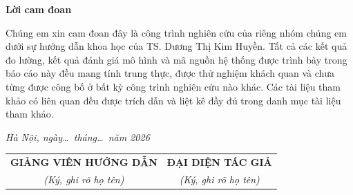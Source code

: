 
\begin{center}
    \Large{\textbf{Lời cam đoan}}
\end{center}
\vspace{1cm}

Chúng em xin cam đoan đây là công trình nghiên cứu của riêng nhóm chúng em dưới sự hướng dẫn khoa học của TS. Dương Thị Kim Huyền. Tất cả các kết quả đo lường, kết quả đánh giá mô hình và mã nguồn hệ thống được trình bày trong báo cáo này đều mang tính trung thực, được thử nghiệm khách quan và chưa từng được công bố ở bất kỳ công trình nghiên cứu nào khác. Các tài liệu tham khảo có liên quan đều được trích dẫn và liệt kê đầy đủ trong danh mục tài liệu tham khảo.

\vspace{1.5cm}

\begin{flushright}
\textit{Hà Nội, ngày\ldots\ tháng\ldots\ năm 2026}
\end{flushright}

\begin{table}[H]
\renewcommand{\arraystretch}{1.5}
\setlength{\tabcolsep}{40pt}
\centering
\begin{tabular}{p{7cm}p{7cm}}
\multicolumn{1}{c}{\textbf{GIẢNG VIÊN HƯỚNG DẪN}} &
\multicolumn{1}{c}{\textbf{ĐẠI DIỆN TÁC GIẢ}} \\[2pt]
\multicolumn{1}{c}{\textit{(Ký, ghi rõ họ tên)}} &
\multicolumn{1}{c}{\textit{(Ký, ghi rõ họ tên)}} \\[12pt]
\end{tabular}
\end{table}

\pagebreak 
